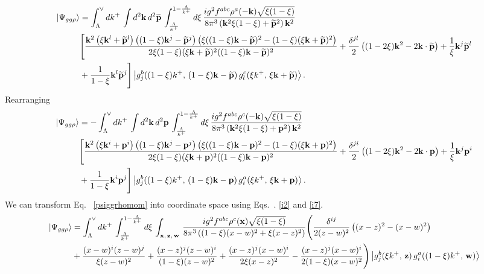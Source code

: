 \documentclass[aps,prd,amsmath,amssymb,nofootinbib]{revtex4-2}
\numberwithin{equation}{section}
\begin{document}
\begin{align}\label{psiggrhomom}
    \left|\Psi_{gg\rho}\right\rangle  & = \int_{\Lambda}^{\vee}dk^{+}\,\int d^{2}\mathbf{k}\, d^{2}\widetilde{\mathbf{p}}\,\int_{\frac{\Lambda}{k^{+}}}^{1-\frac{\Lambda}{k^{+}}}d\xi\,\frac{ig^{2}f^{abc}\rho^{a}(-\mathbf{k})\sqrt{\xi(1-\xi)}}{8\pi^{3}\left(\mathbf{k}^{2}\xi(1-\xi)+\widetilde{\mathbf{p}}^{2}\right)\mathbf{k}^{2}}\notag \\
&\Bigg[\frac{\mathbf{k}^{2}\left(\xi \mathbf{k}^{l}+\widetilde{\mathbf{p}}^{l}\right)\left((1-\xi)\mathbf{k}^{j}-\widetilde{\mathbf{p}}^{j}\right)\left(\xi((1-\xi)\mathbf{k}-\widetilde{\mathbf{p}})^{2}-(1-\xi)(\xi \mathbf{k}+\widetilde{\mathbf{p}})^{2}\right)}{2\xi(1-\xi)(\xi \mathbf{k}+\widetilde{\mathbf{p}})^{2}((1-\xi)\mathbf{k}-\widetilde{\mathbf{p}})^{2}}+\frac{\delta^{jl}}{2}\left((1-2\xi)\mathbf{k}^{2}-2\mathbf{k}\cdot\widetilde{\mathbf{p}}\right)+\frac{1}{\xi}\mathbf{k}^{j}\widetilde{\mathbf{p}}^{l}\notag \\ & +\frac{1}{1-\xi}\mathbf{k}^{l}\widetilde{\mathbf{p}}^{j}\Bigg] \left|g_{j}^{b}((1-\xi)k^{+},\,(1-\xi)\mathbf{k}-\widetilde{\mathbf{p}})\, g_{l}^{c}(\xi k^{+},\,\xi\mathbf{k}+\widetilde{\mathbf{p}})\right\rangle.
\end{align}
Rearranging
\begin{align}\label{psiggrhomomre}
    \left|\Psi_{gg\rho}\right\rangle  & = -\int_{\Lambda}^{\vee}dk^{+}\,\int d^{2}\mathbf{k}\, d^{2}\mathbf{p}\,\int_{\frac{\Lambda}{k^{+}}}^{1-\frac{\Lambda}{k^{+}}}d\xi\,\frac{ig^{2}f^{abc}\rho^{c}(-\mathbf{k})\sqrt{\xi(1-\xi)}}{8\pi^{3}\left(\mathbf{k}^{2}\xi(1-\xi)+\mathbf{p}^{2}\right)\mathbf{k}^{2}}\notag \\
&\Bigg[\frac{\mathbf{k}^{2}\left(\xi \mathbf{k}^{i}+\mathbf{p}^{i}\right)\left((1-\xi)\mathbf{k}^{j}-\mathbf{p}^{j}\right)\left(\xi((1-\xi)\mathbf{k}-\mathbf{p})^{2}-(1-\xi)(\xi \mathbf{k}+\mathbf{p})^{2}\right)}{2\xi(1-\xi)(\xi \mathbf{k}+\mathbf{p})^{2}((1-\xi)\mathbf{k}-\mathbf{p})^{2}}+\frac{\delta^{ji}}{2}\left((1-2\xi)\mathbf{k}^{2}-2\mathbf{k}\cdot\mathbf{p}\right)+\frac{1}{\xi}\mathbf{k}^{j}\mathbf{p}^{i}\notag \\ & +\frac{1}{1-\xi}\mathbf{k}^{i}\mathbf{p}^{j}\Bigg] \left|g_{j}^{b}((1-\xi)k^{+},\,(1-\xi)\mathbf{k}-\mathbf{p})\, g_{i}^{a}(\xi k^{+},\,\xi\mathbf{k}+\mathbf{p})\right\rangle.
\end{align}
We can transform Eq.~ \eqref{psiggrhomom} into coordinate space using Eqs.~. \eqref{i2} and \eqref{i7}.
\begin{align}\label{ggrhopos}
 \left|\Psi_{gg\rho}\right\rangle  & = \int_{\Lambda}^{\vee}dk^{+}\,\int_{\frac{\Lambda}{k^{+}}}^{1-\frac{\Lambda}{k^{+}}}d\xi\,\int_{\mathbf{x},\, \mathbf{z},\, \mathbf{w}}\,\frac{ig^{2}f^{abc}\rho^{c}(\mathbf{x})\sqrt{\xi(1-\xi)}}{8\pi^{3}\left((1-\xi)(x-w)^{2}+\xi (x-z)^{2}\right)}\Bigg(\frac{\delta^{ij}}{2(z-w)^{2}}\left((x-z)^{2}-(x-w)^{2}\right)\notag \\ & +\frac{(x-w)^{i}(z-w)^{j}}{\xi (z-w)^{2}}+\frac{(x-z)^{j}(z-w)^{i}}{(1-\xi)(z-w)^{2}}+\frac{(x-z)^{j}(x-w)^{i}}{2\xi (x-z)^{2}} -\frac{(x-z)^{j}(x-w)^{i}}{2(1-\xi)(x-w)^{2}}\Bigg)\left|g_{j}^{b}(\xi k^{+},\,\mathbf{z})\, g_{i}^{a}((1-\xi)k^{+},\,\mathbf{w})\right\rangle
\end{align}
\end{document}
